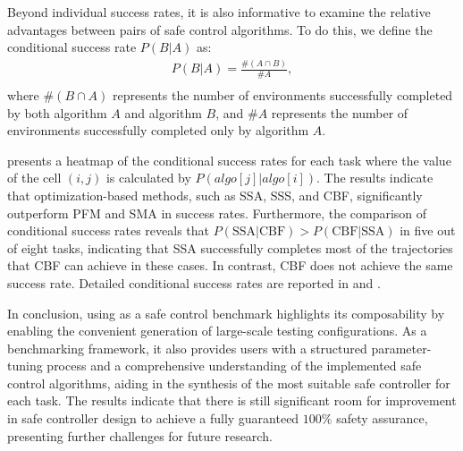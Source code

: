 Beyond individual success rates, it is also informative to examine the relative advantages between pairs of safe control algorithms. To do this, we define the conditional success rate \( P(B|A) \) as:
\begin{align}
    P(B|A) = \frac{\#(A \cap B)}{\#A}, \\ \nonumber
\end{align}
where \( \#(B \cap A) \) represents the number of environments successfully completed by both algorithm \( A \) and algorithm \( B \), and \( \#A \) represents the number of environments successfully completed only by algorithm \( A \).  

 presents a heatmap of the conditional success rates for each task where the value of the cell $(i, j)$ is calculated by $P(algo[j]|algo[i])$. The results indicate that optimization-based methods, such as SSA, SSS, and CBF, significantly outperform PFM and SMA in success rates. Furthermore, the comparison of conditional success rates reveals that \( P(\text{SSA}|\text{CBF}) > P(\text{CBF}|\text{SSA}) \) in five out of eight tasks, indicating that SSA successfully completes most of the trajectories that CBF can achieve in these cases. In contrast, CBF does not achieve the same success rate. Detailed conditional success rates are reported in  and .

In conclusion, using \spark as a safe control benchmark highlights its composability by enabling the convenient generation of large-scale testing configurations. As a benchmarking framework, it also provides users with a structured parameter-tuning process and a comprehensive understanding of the implemented safe control algorithms, aiding in the synthesis of the most suitable safe controller for each task. The results indicate that there is still significant room for improvement in safe controller design to achieve a fully guaranteed $100\%$ safety assurance, presenting further challenges for future research.